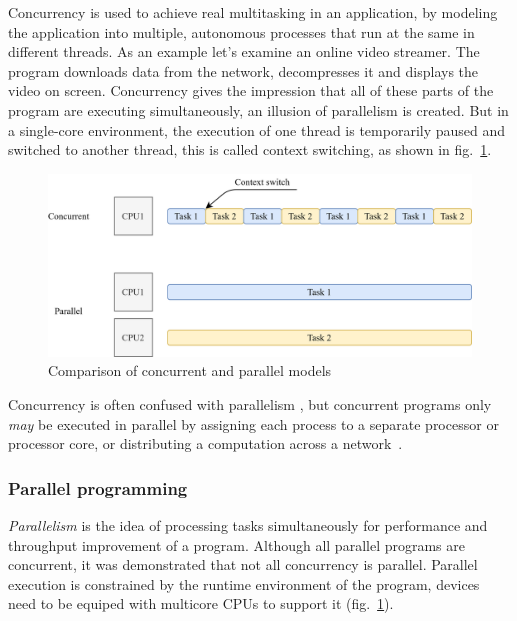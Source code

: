 Concurrency is used to achieve real multitasking in an application, by modeling the application into multiple, autonomous processes that run at the same in different threads.
As an example let's examine an online video streamer. The program downloads data from the network, decompresses it and displays the video on screen.
Concurrency gives the impression that all of these parts of the program are executing simultaneously, an illusion of parallelism is created. 
But in a single-core environment, the execution of one thread is temporarily paused and switched to another thread, this is called context switching, as shown in fig.~\ref{fig:convspar}.
\begin{figure}[htb]
	\centering
		\includegraphics[scale=1.0]{figures02/convspar.png}
	\caption{Comparison of concurrent and parallel models}
	\label{fig:convspar}
\end{figure}

Concurrency is often confused with parallelism \cite{waza}, but concurrent programs only \emph{may} be executed in parallel 
by assigning each process to a separate processor or processor core, or distributing a computation across a network~\cite{mordechai}.

\subsubsection{Parallel programming}
\emph{Parallelism} is the idea of processing tasks simultaneously for performance and throughput improvement of a program. Although all parallel programs are concurrent, it was demonstrated that not all concurrency is parallel.
Parallel execution is constrained by the runtime environment of the program, devices need to be equiped with multicore CPUs to support it (fig.~\ref{fig:convspar}).


